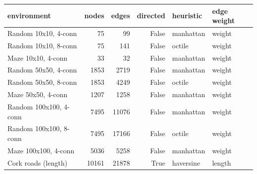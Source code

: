 \begin{tabular}{lrrrll}
\toprule
environment & nodes & edges & directed & heuristic & edge weight \\
\midrule
Random 10x10, 4-conn & 75 & 99 & False & manhattan & weight \\
Random 10x10, 8-conn & 75 & 141 & False & octile & weight \\
Maze 10x10, 4-conn & 33 & 32 & False & manhattan & weight \\
Random 50x50, 4-conn & 1853 & 2719 & False & manhattan & weight \\
Random 50x50, 8-conn & 1853 & 4249 & False & octile & weight \\
Maze 50x50, 4-conn & 1207 & 1258 & False & manhattan & weight \\
Random 100x100, 4-conn & 7495 & 11076 & False & manhattan & weight \\
Random 100x100, 8-conn & 7495 & 17166 & False & octile & weight \\
Maze 100x100, 4-conn & 5036 & 5258 & False & manhattan & weight \\
Cork roads (length) & 10161 & 21878 & True & haversine & length \\
\bottomrule
\end{tabular}
